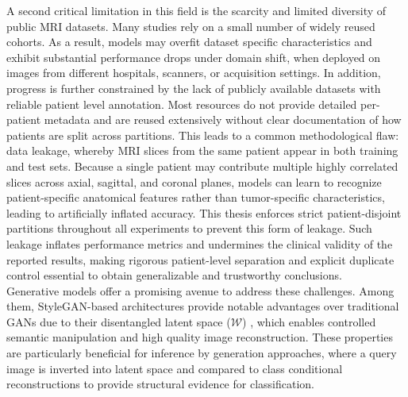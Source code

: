 A second critical limitation in this field is the scarcity and limited diversity of public MRI datasets. Many studies rely on a small number of widely reused cohorts. As a result, models may overfit dataset specific characteristics and exhibit substantial performance drops under domain shift, when deployed on images from different hospitals, scanners, or acquisition settings. In addition, progress is further constrained by the lack of publicly available datasets with reliable patient level annotation. Most resources do not provide detailed per-patient metadata and are reused extensively without clear documentation of how patients are split across partitions. This leads to a common methodological flaw: data leakage, whereby MRI slices from the same patient appear in both training and test sets. Because a single patient may contribute multiple highly correlated slices across axial, sagittal, and coronal planes, models can learn to recognize patient-specific anatomical features rather than tumor-specific characteristics, leading to artificially inflated accuracy. This thesis enforces strict patient-disjoint partitions throughout all experiments to prevent this form of leakage. Such leakage inflates performance metrics and undermines the clinical validity of the reported results, making rigorous patient-level separation and explicit duplicate control essential to obtain generalizable and trustworthy conclusions.\\



Generative models offer a promising avenue to address these challenges. Among them, StyleGAN-based architectures provide notable advantages over traditional GANs due to their disentangled latent space ($\mathcal{W}$) \cite{karras2019stylebasedgeneratorarchitecturegenerative}, which enables controlled semantic manipulation and high quality image reconstruction. These properties are particularly beneficial for inference by generation approaches, where a query image is inverted into latent space and compared to class conditional reconstructions to provide structural evidence for classification. \\


